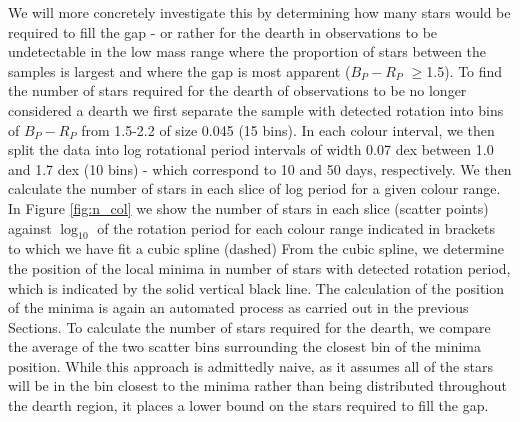 We will more concretely investigate this by determining how many stars would be required to fill the gap - or rather for the dearth in observations to be undetectable in the low mass range where the proportion of stars between the samples is largest and where the gap is most apparent ($B_P-R_P$ $\geq$1.5).
To find the number of stars required for the dearth of observations to be no longer considered a dearth we first separate the sample with detected rotation into bins of $B_P - R_P$  from 1.5-2.2 of size 0.045 (15 bins).
In each colour interval, we then split the data into log rotational period intervals of width 0.07 dex between 1.0 and 1.7 dex (10 bins) - which correspond to 10 and 50 days, respectively.
We then calculate the number of stars in each slice of log period for a given colour range.
In Figure \ref{fig:n_col} we show the number of stars in each slice (scatter points) against $\log_{10}$ of the rotation period for each colour range indicated in brackets to which we have fit a cubic spline (dashed)
From the cubic spline, we determine the position of the local minima in number of stars with detected rotation period, which is indicated by the solid vertical black line.
The calculation of the position of the minima is again an automated process as carried out in the previous Sections.
To calculate the number of stars required for the dearth, we compare the average of the two scatter bins surrounding the closest bin of the minima position.
While this approach is admittedly naive, as it assumes all of the stars will be in the bin closest to the minima rather than being distributed throughout the dearth region, it places a lower bound on the stars required to fill the gap.

